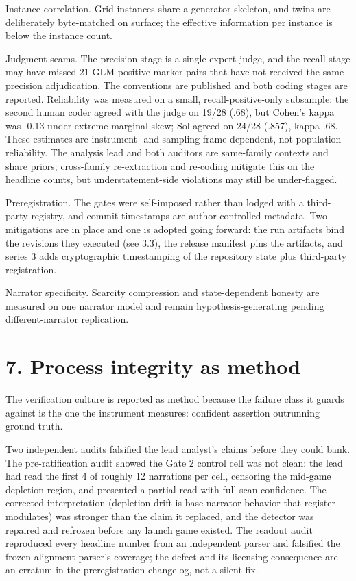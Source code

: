 \documentclass[11pt]{article}
\begin{document}
Instance correlation. Grid instances share a generator skeleton, and
twins are deliberately byte-matched on surface; the effective
information per instance is below the instance count.

Judgment seams. The precision stage is a single expert judge, and the
recall stage may have missed 21 GLM-positive marker pairs that have not
received the same precision adjudication. The conventions are published
and both coding stages are reported. Reliability was measured on a
small, recall-positive-only subsample: the second human coder agreed
with the judge on 19/28 (.68), but Cohen's kappa was -0.13 under extreme
marginal skew; Sol agreed on 24/28 (.857), kappa .68. These estimates
are instrument- and sampling-frame-dependent, not population
reliability. The analysis lead and both auditors are same-family
contexts and share priors; cross-family re-extraction and re-coding
mitigate this on the headline counts, but understatement-side violations
may still be under-flagged.

Preregistration. The gates were self-imposed rather than lodged with a
third-party registry, and commit timestamps are author-controlled
metadata. Two mitigations are in place and one is adopted going forward:
the run artifacts bind the revisions they executed (see 3.3), the
release manifest pins the artifacts, and series 3 adds cryptographic
timestamping of the repository state plus third-party registration.

Narrator specificity. Scarcity compression and state-dependent honesty
are measured on one narrator model and remain hypothesis-generating
pending different-narrator replication.

\section*{7. Process integrity as method}

The verification culture is reported as method because the failure class
it guards against is the one the instrument measures: confident
assertion outrunning ground truth.

Two independent audits falsified the lead analyst's claims before they
could bank. The pre-ratification audit showed the Gate 2 control cell
was not clean: the lead had read the first 4 of roughly 12 narrations
per cell, censoring the mid-game depletion region, and presented a
partial read with full-scan confidence. The corrected interpretation
(depletion drift is base-narrator behavior that register modulates) was
stronger than the claim it replaced, and the detector was repaired and
refrozen before any launch game existed. The readout audit reproduced
every headline number from an independent parser and falsified the
frozen alignment parser's coverage; the defect and its licensing
consequence are an erratum in the preregistration changelog, not a
silent fix.
\end{document}
